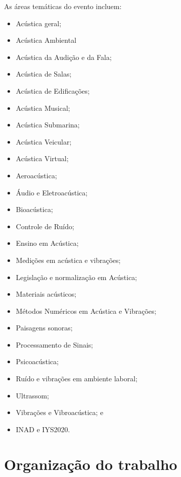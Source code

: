 \documentclass[12pt, a4paper, twoside, twocolumn]{article}
\begin{document}
\vspace{5pt}

As áreas temáticas do evento incluem:
%	
\begin{itemize}[noitemsep,topsep=-1ex] \itemsep=1.5pt
\item[\textbullet] Acústica geral; 
\item[\textbullet]Acústica Ambiental
\item[\textbullet]Acústica da Audição e da Fala;
\item[\textbullet]Acústica de Salas;
\item[\textbullet]Acústica de Edificações;
\item[\textbullet]Acústica Musical;
\item[\textbullet]Acústica Submarina;
\item[\textbullet]Acústica Veicular;
\item[\textbullet]Acústica Virtual;
\item[\textbullet]Aeroacústica;
\item[\textbullet]Áudio e Eletroacústica;
\item[\textbullet]Bioacústica;
\item[\textbullet]Controle de Ruído;
\item[\textbullet]Ensino em Acústica;
\item[\textbullet]Medições em acústica e vibrações;
\item[\textbullet]Legislação e normalização em Acústica;
\item[\textbullet]Materiais acústicos;
\item[\textbullet]Métodos Numéricos em Acústica e Vibrações;
\item[\textbullet]Paisagens sonoras;
\item[\textbullet]Processamento de Sinais;
\item[\textbullet]Psicoacústica;
\item[\textbullet]Ruído e vibrações em ambiente laboral;
\item[\textbullet]Ultrassom; 
\item[\textbullet]Vibrações e Vibroacústica; e
\item[\textbullet]INAD e IYS2020.
	\end{itemize}
	

\section{Organização do trabalho}
\end{document}
